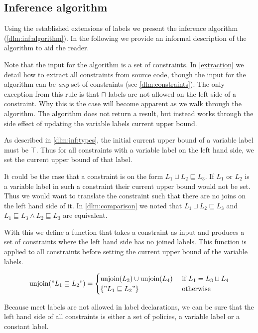 \subsection{Inference algorithm}\label{dlm:inf:algsection}
Using the established extensions of labels we present the inference algorithm (\cref{dlm:inf:algorithm}).
In the following we provide an informal description of the algorithm to aid the reader.

Note that the input for the algorithm is a set of constraints.
In \cref{extraction} we detail how to extract all constraints from source code, though the input for the algorithm can be \textit{any} set of constraints (see \cref{dlm:constraints}).
The only exception from this rule is that $\sqcap$ labels are not allowed on the left side of a constraint.
Why this is the case will become apparent as we walk through the algorithm.
The algorithm does not return a result, but instead works through the side effect of updating the variable labels current upper bound.



As described in \cref{dlm:inf:types}, the initial current upper bound of a variable label must be $\top$.
Thus for all constraints with a variable label on the left hand side, we set the current upper bound of that label.

It could be the case that a constraint is on the form $L_1 \sqcup L_2 \sqsubseteq L_3$.
If $L_1$ or $L_2$ is a variable label in such a constraint their current upper bound would not be set.
Thus we would want to translate the constraint such that there are no joins on the left hand side of it.
In \cref{dlm:comparison} we noted that $L_1 \sqcup L_2 \sqsubseteq L_3$ and $L_1 \sqsubseteq L_3 \wedge L_2 \sqsubseteq L_3$ are equivalent.

With this we define a function that takes a constraint as input and produces a set of constraints where the left hand side has no joined labels.
This function is applied to all constraints before setting the current upper bound of the variable labels.

\[
\text{unjoin}("L_1 \sqsubseteq L_2") =
\begin{cases}
  \text{unjoin}(L_3) \cup \text{unjoin}(L_4) & \text{ if } L_1 = L_3 \sqcup L_4\\
  \{"L_1 \sqsubseteq L_2"\} & \text{ otherwise}
\end{cases}
\]

Because meet labels are not allowed in label declarations, we can be sure that the left hand side of all constraints is either a set of policies, a variable label or a constant label.

